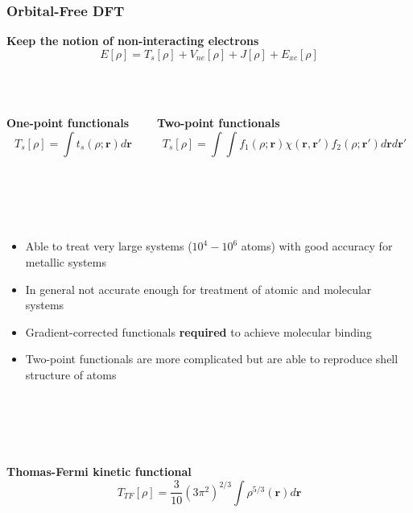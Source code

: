 \documentclass[mathserif, 8pt]{beamer}
\begin{document}
\begin{frame}
    \frametitle{Orbital-Free DFT}
    \centering
    \textbf{Keep the notion of non-interacting electrons}
    \begin{equation}
	\nonumber
	E[\rho] = T_s[\rho] + V_{ne}[\rho] + J[\rho] + E_{xc}[\rho]
    \end{equation}
    \ \\
    \ \\
    \begin{columns}
    \begin{column}{.40\textwidth}
	\centering
	\textbf{One-point functionals}
	\begin{equation}
	    \nonumber
	    T_s[\rho] = \int t_s(\rho;\boldsymbol{r}) d\boldsymbol{r}
	\end{equation}
    \end{column}
    \begin{column}{.60\textwidth}
	\centering
	\textbf{Two-point functionals}
	\begin{equation}
	    \nonumber
	    T_s[\rho] = \int \int f_1(\rho;\boldsymbol{r})\chi(\boldsymbol{r},\boldsymbol{r}') f_2(\rho;\boldsymbol{r}') d\boldsymbol{r}d\boldsymbol{r}'
	\end{equation}
    \end{column}
    \end{columns}
    \ \\
    \ \\
    \ \\
    \begin{itemize}
	\item	Able to treat very large systems ($10^4-10^6$ atoms) with good accuracy for metallic systems
	\item	In general not accurate enough for treatment of atomic and molecular systems
	\item	Gradient-corrected functionals \textbf{required} to achieve molecular binding
	\item	Two-point functionals are more complicated but are able to reproduce shell structure of atoms
    \end{itemize}
    \ \\
    \ \\
    \ \\
    \begin{columns}
    \begin{column}{.50\textwidth}
	\centering
	\textbf{Thomas-Fermi kinetic functional}
	\begin{equation}
	    \nonumber
	    T_{TF}[\rho] = \frac{3}{10}\left(3\pi^2\right)^{2/3}\int \rho^{5/3}(\boldsymbol{r}) d\boldsymbol{r}

\end{equation}
\end{column}
\end{columns}
\end{frame}
\end{document}
